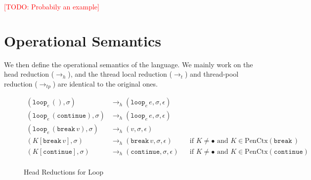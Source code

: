 \documentclass{article}
\numberwithin{algorithm}{section}
\newcommand{\cloop}[1]{\texttt{loop}_{#1}\,}
\newcommand{\cbreak}{\texttt{break}\,}
\newcommand{\ccontinue}{\texttt{continue}}
\newcommand{\cseq}{\,;;\,}
\newcommand{\creturn}{\texttt{return}\,}
\newcommand{\ccall}{\texttt{call}\,}
\newcommand{\pure}[1]{\text{PenCtx}(#1)}
\newcommand{\hred}{\rightarrow_h}
\newcommand{\tred}{\rightarrow_t}
\newcommand{\tpred}{\rightarrow_{tp}}
\newcommand{\todo}[1]{\textcolor{red}{[TODO: #1]}}
\begin{document}
\todo{Probabily an example}


\section{Operational Semantics}

We then define the operational semantics of the language.
We mainly work on the head reduction ($\hred$), and the thread local reduction ($\tred$) and thread-pool reduction ($\tpred$) are identical to the original ones.

\begin{figure}[h]
$$
\begin{aligned}
    (\cloop{e} (), \sigma) &\hred (\cloop{e} e, \sigma, \epsilon) && \\
    (\cloop{e} (\ccontinue), \sigma) &\hred (\cloop{e} e, \sigma, \epsilon) &&  \\
    (\cloop{e} (\cbreak v), \sigma) &\hred (v, \sigma, \epsilon) && \\
    (K[\cbreak v], \sigma) &\hred (\cbreak v, \sigma, \epsilon) && \text{if } K \neq \bullet \text{ and } K \in \pure{\cbreak\!} \\
    (K[\ccontinue], \sigma) &\hred (\ccontinue, \sigma, \epsilon) && \text{if } K \neq \bullet \text{ and } K \in \pure{\ccontinue} \\
\end{aligned}
$$
\caption{Head Reductions for Loop}
\label{fig:hred-loop}
\end{figure}
\end{document}
